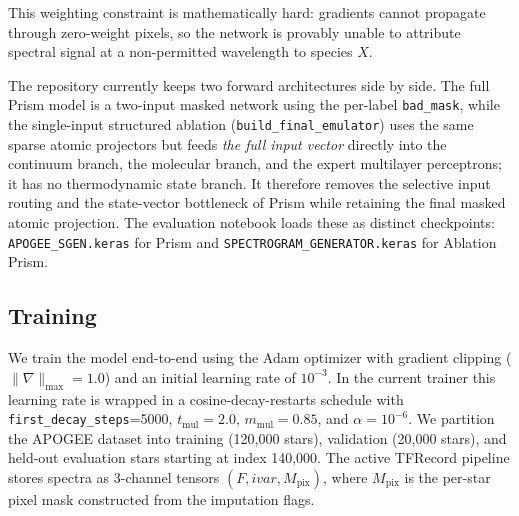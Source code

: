 \documentclass[preprint]{aastex701-1/aastex701}
\begin{document}
This weighting constraint is mathematically hard: gradients cannot propagate through
zero-weight pixels, so the network is provably unable to attribute spectral signal at a
non-permitted wavelength to species $X$.

The repository currently keeps two forward architectures side by side. The full Prism
model is a two-input masked network using the per-label \texttt{bad\_mask}, while the
single-input structured ablation (\texttt{build\_final\_emulator}) uses the same sparse
atomic projectors but feeds \emph{the full input vector} directly into the continuum
branch, the molecular branch, and the expert multilayer perceptrons; it has no
thermodynamic state branch. It therefore removes the selective input routing and the
state-vector bottleneck of Prism while retaining the final masked atomic projection. The evaluation notebook loads these as
distinct checkpoints: \texttt{APOGEE\_SGEN.keras} for Prism and
\texttt{SPECTROGRAM\_GENERATOR.keras} for Ablation Prism.

\subsection{Training}
\label{subsec:training}

We train the model end-to-end using the Adam optimizer with gradient clipping
($\|\nabla\|_{\max} = 1.0$) and an initial learning rate of $10^{-3}$. In the current
trainer this learning rate is wrapped in a cosine-decay-restarts schedule with
\texttt{first\_decay\_steps}=5000, $t_\mathrm{mul}=2.0$, $m_\mathrm{mul}=0.85$, and
$\alpha=10^{-6}$. We partition the APOGEE dataset into training (120,000 stars),
validation (20,000 stars), and held-out evaluation stars starting at index 140,000. The
active TFRecord pipeline stores spectra as 3-channel tensors
$(F,\mathit{ivar},M_\mathrm{pix})$, where $M_\mathrm{pix}$ is the per-star pixel mask
constructed from the imputation flags.
\end{document}
